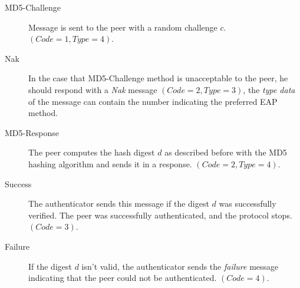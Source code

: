\begin{description}
	\item [MD5-Challenge] Message is sent to the peer with a random challenge $c$. $(Code=1, Type=4)$.
	\item [Nak] In the case that MD5-Challenge method is unacceptable to the peer, he should respond with a \textit{Nak} message $(Code=2, Type=3)$, the \textit{type data} of the message can contain the number indicating the preferred EAP method.
	\item [MD5-Response] The peer computes the hash digest $d$ as described before with the MD5 hashing algorithm and sends it in a response. $(Code=2, Type=4)$.
	\item [Success] The authenticator sends this message if the digest $d$ was successfully verified. The peer was successfully authenticated, and the protocol stops. $(Code=3)$.
	\item [Failure] If the digest $d$ isn't valid, the authenticator sends the \textit{failure} message indicating that the peer could not be authenticated. $(Code=4)$.
\end{description}



































